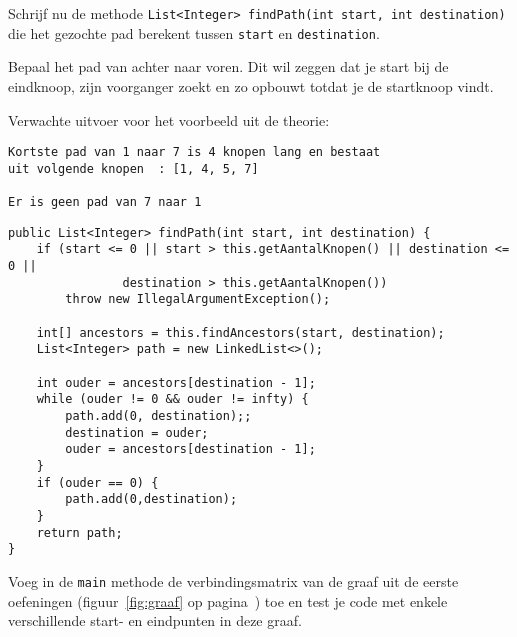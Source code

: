 \begin{oef}
\code Schrijf nu de methode \verb/List<Integer> findPath(int start, int destination)/ die het gezochte pad berekent tussen \verb/start/ en \verb/destination/. 

Bepaal het pad van achter naar voren. Dit wil zeggen dat je start bij de eindknoop,  zijn voorganger zoekt en zo opbouwt totdat je de startknoop vindt.

Verwachte uitvoer voor het voorbeeld uit de theorie:
\begin{verbatim}
Kortste pad van 1 naar 7 is 4 knopen lang en bestaat 
uit volgende knopen  : [1, 4, 5, 7]

Er is geen pad van 7 naar 1
\end{verbatim}
	

\begin{opl}
\begin{lstlisting}[caption={findPath}, label=BFSfindPath]
public List<Integer> findPath(int start, int destination) {
	if (start <= 0 || start > this.getAantalKnopen() || destination <= 0 || 
				destination > this.getAantalKnopen())
		throw new IllegalArgumentException();

	int[] ancestors = this.findAncestors(start, destination);
	List<Integer> path = new LinkedList<>();

	int ouder = ancestors[destination - 1];
	while (ouder != 0 && ouder != infty) {
		path.add(0, destination);;
		destination = ouder;
		ouder = ancestors[destination - 1];
	}
	if (ouder == 0) {
		path.add(0,destination);
	}
	return path;
}
	\end{lstlisting}
\end{opl}

\end{oef}

\begin{oef}
\code Voeg in de \verb+main+ methode de verbindingsmatrix van de graaf uit de eerste oefeningen (figuur~\ref{fig:graaf} op pagina~\pageref{fig:graaf}) toe en test je code met enkele verschillende start- en eindpunten in deze graaf.

\end{oef}






